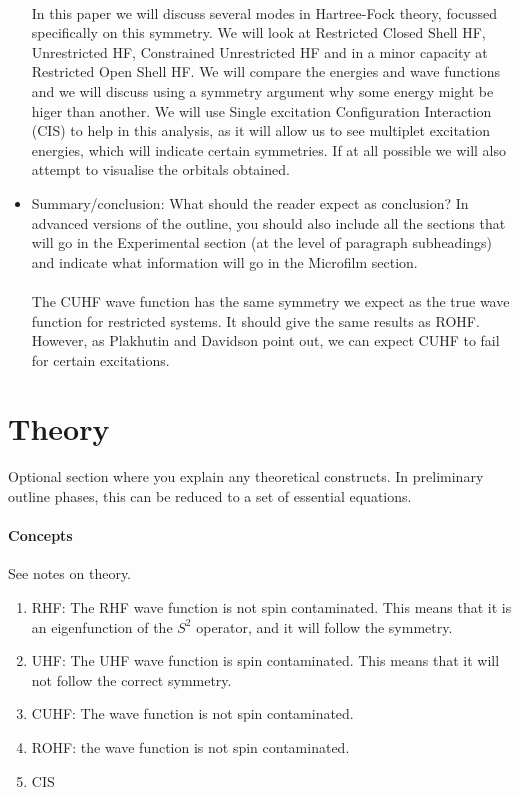 \documentclass[twoside,twocolumn,9pt]{article}
\begin{document}
\begin{itemize}
    \paragraph*{}
    In this paper we will discuss several modes in Hartree-Fock theory, focussed specifically on this symmetry. We will look at Restricted Closed
Shell HF, Unrestricted HF, Constrained Unrestricted HF and in a minor capacity at Restricted Open Shell HF. We will compare the energies
and wave functions and we will discuss using a symmetry argument why some energy might be higer than another. We will use 
Single excitation Configuration Interaction (CIS) to help in this analysis, as it will allow us to see multiplet excitation energies, 
which will indicate certain symmetries. If at all possible we will also attempt to visualise the orbitals obtained. 
    \item Summary/conclusion: What should the reader expect as conclusion? In advanced versions of the outline, you should also include all the sections that will go in the Experimental section (at the level of paragraph subheadings) and indicate what information will go in the Microfilm section.
    \paragraph*{}
    The CUHF wave function has the same symmetry we expect as the true wave function for restricted systems. It should give the same results as ROHF. However, as Plakhutin and Davidson point out, we can expect CUHF to fail for certain excitations.
\end{itemize}

\section{Theory}

Optional section where you explain any theoretical constructs. In preliminary outline phases, this can be reduced to a set of essential equations.
\paragraph*{Concepts}
See notes on theory.
\begin{enumerate}
  \item RHF: The RHF wave function is not spin contaminated. This means that it is an eigenfunction of the $S^2$ operator, and it will follow the symmetry.
  \item UHF: The UHF wave function is spin contaminated. This means that it will not follow the correct symmetry.
  \item CUHF: The wave function is not spin contaminated.
  \item ROHF: the wave function is not spin contaminated.
  \item CIS
\end{enumerate}
\end{document}
